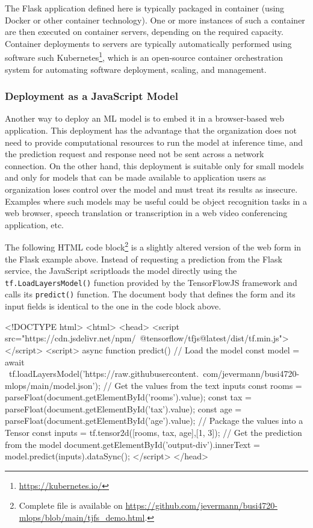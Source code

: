 The Flask application defined here is typically packaged in container (using Docker or other container technology). One or more instances of such a container are then executed on container servers, depending on the required capacity. Container deployments to servers are typically automatically performed using software such Kubernetes\footnote{\url{https://kubernetes.io/}}, which is an open-source container orchestration system for automating software deployment, scaling, and management. 

\subsubsection*{Deployment as a JavaScript Model}

Another way to deploy an ML model is to embed it in a browser-based web application. This deployment has the advantage that the organization does not need to provide computational resources to run the model at inference time, and the prediction request and response need not be sent across a network connection. On the other hand, this deployment is suitable only for small models and only for models that can be made available to application users as organization loses control over the model and must treat its results as insecure. Examples where such models may be useful could be object recognition tasks in a web browser, speech translation or transcription in a web video conferencing application, etc. 

The following HTML code block\footnote{Complete file is available on \url{https://github.com/jevermann/busi4720-mlops/blob/main/tjfs_demo.html}.} is a slightly altered version of the web form in the Flask example above. Instead of requesting a prediction from the Flask service, the JavaScript scriptloads the model directly using the \texttt{tf.LoadLayersModel()} function provided by the TensorFlowJS framework and calls its \texttt{predict()} function. The document body that defines the form and its input fields is identical to the one in the code block above. 

\begin{samepage}
\begin{htmlcode}
<!DOCTYPE html>
<html>
 <head>
  <script src="https://cdn.jsdelivr.net/npm/\
     @tensorflow/tfjs@latest/dist/tf.min.js"></script>
  <script>
   async function predict() {
    // Load the model
    const model = await \
     tf.loadLayersModel('https://raw.githubusercontent.\
      com/jevermann/busi4720-mlops/main/model.json');
    // Get the values from the text inputs
    const rooms = parseFloat(document.getElementById('rooms').value);
    const tax = parseFloat(document.getElementById('tax').value);
    const age = parseFloat(document.getElementById('age').value);
    // Package the values into a Tensor
    const inputs = tf.tensor2d([rooms, tax, age],[1, 3]);
    // Get the prediction from the model
    document.getElementById('output-div').innerText = 
     model.predict(inputs).dataSync();
   }
  </script>
 </head>
\end{htmlcode}
\end{samepage}

